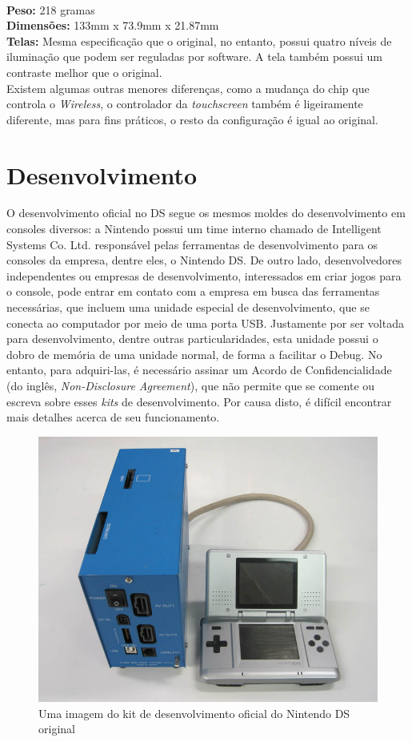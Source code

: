 \documentclass[brazil]{abnt}
\begin{document}
\\
{\bf Peso:} 218 gramas\\
{\bf Dimensões:} 133mm x 73.9mm x 21.87mm\\
{\bf Telas:} Mesma especificação que o original, no entanto, possui quatro níveis de iluminação que podem ser reguladas por software. A tela também possui um contraste melhor que o original.\\
Existem algumas outras menores diferenças, como a mudança do chip que controla o \textit{Wireless}, o controlador da \textit{touchscreen} também é ligeiramente diferente, mas para fins práticos, o resto da configuração é igual ao original.

\section{Desenvolvimento}

O desenvolvimento oficial no DS segue os mesmos moldes do desenvolvimento em consoles diversos: a Nintendo possui um time interno chamado de Intelligent Systems Co. Ltd. responsável pelas ferramentas de desenvolvimento para os consoles da empresa, dentre eles, o Nintendo DS. De outro lado, desenvolvedores independentes ou empresas de desenvolvimento, interessados em criar jogos para o console, pode entrar em contato com a empresa em busca das ferramentas necessárias, que incluem uma unidade especial de desenvolvimento, que se conecta ao computador por meio de uma porta USB. Justamente por ser voltada para desenvolvimento, dentre outras particularidades, esta unidade possui o dobro de memória de uma unidade normal, de forma a facilitar o Debug. No entanto, para adquiri-las, é necessário assinar um Acordo de Confidencialidade (do inglês, \textit{Non-Disclosure Agreement}), que não permite que se comente ou escreva sobre esses \textit{kits} de desenvolvimento. Por causa disto, é difícil encontrar mais detalhes acerca de seu funcionamento.

\begin{figure}
\centering
\includegraphics{imgs/is_devkit1.jpg}
\caption{Uma imagem do kit de desenvolvimento oficial do Nintendo DS original} 
\end{figure}
\end{document}
